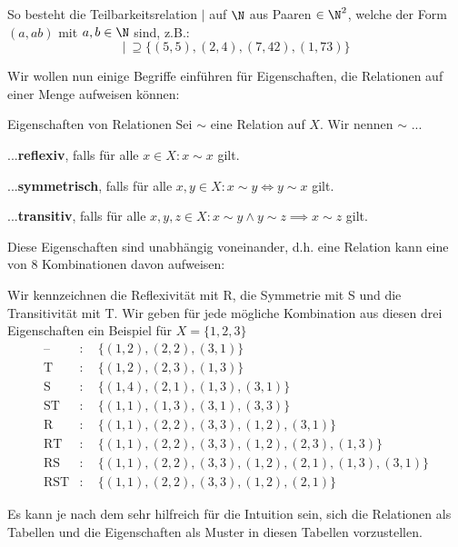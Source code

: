 \begin{example} So besteht die Teilbarkeitsrelation $\mid$ auf $\N$ aus Paaren $\in \N^2$, welche der Form $(a,ab)$ mit $a,b \in \N$ sind, z.B.:
$$\mid \ \supseteq \{(5 ,5), (2,4), (7,42), (1,73)\}$$
\end{example}

Wir wollen nun einige Begriffe einführen für Eigenschaften, die Relationen auf einer Menge aufweisen können:

\begin{definition}{Eigenschaften von Relationen}{}
Sei $\sim$ eine Relation auf $X$. Wir nennen $\sim$ ...

...\textbf{reflexiv}, falls für alle $x \in X: x\sim x$ gilt.

...\textbf{symmetrisch}, falls für alle $x, y \in X: x\sim y \iff y \sim x$ gilt.

...\textbf{transitiv}, falls für alle $x, y,z \in X: x\sim y \land y \sim z \implies x \sim z$ gilt.
\end{definition}

Diese Eigenschaften sind unabhängig voneinander, d.h. eine Relation kann eine von 8 Kombinationen davon aufweisen:

\begin{example} \label{ex_all_rel_combs} Wir kennzeichnen die Reflexivität mit R, die Symmetrie mit S und die Transitivität mit T. Wir geben für jede mögliche Kombination aus diesen drei Eigenschaften ein Beispiel für $X = \{1, 2, 3\}$
\begin{align*}
    \text{--}&:  \quad \{(1, 2),(2, 2), (3, 1)\} \\
    \text{T}&:  \quad \{(1, 2),(2, 3), (1, 3)\} \\
    \text{S}&:  \quad \{(1, 4),(2, 1),(1,3),(3,1)\} \\
    \text{ST}&:  \quad \{(1,1), (1, 3),(3, 1), (3, 3)\} \\
    \text{R}&:  \quad \{(1, 1),(2, 2), (3, 3), (1,2), (3,1)\} \\
    \text{RT}&:  \quad \{(1, 1),(2, 2), (3, 3), (1,2), (2,3), (1,3)\} \\
    \text{RS}&:  \quad \{(1, 1),(2, 2), (3, 3), (1,2), (2,1), (1,3), (3, 1)\} \\
    \text{RST}&:  \quad \{(1, 1),(2, 2), (3, 3), (1,2), (2,1)\} 
\end{align*}
\end{example}

Es kann je nach dem sehr hilfreich für die Intuition sein, sich die Relationen als Tabellen und die Eigenschaften als Muster in diesen Tabellen vorzustellen.

